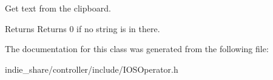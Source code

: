 Get text from the clipboard. 

\begin{DoxyReturn}{Returns}
Returns 0 if no string is in there. 
\end{DoxyReturn}


The documentation for this class was generated from the following file\+:\begin{DoxyCompactItemize}
\item 
indie\+\_\+share/controller/include/I\+O\+S\+Operator.\+h\end{DoxyCompactItemize}
